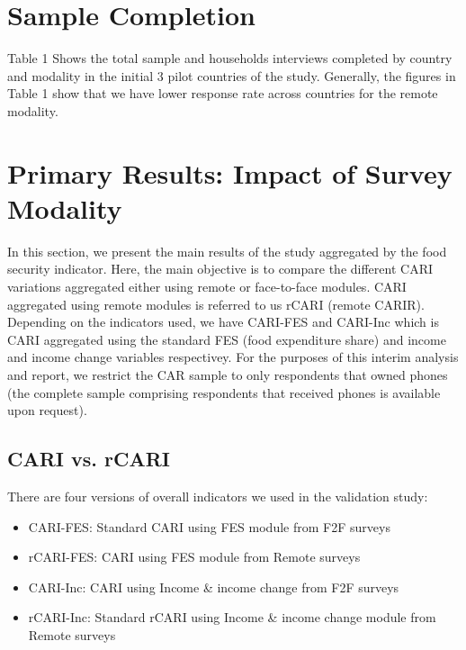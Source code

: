 \documentclass[11pt,harvard]{article}
\begin{document}
\pagebreak
	
\section{Sample Completion}
Table 1 Shows the total sample and households interviews completed by country and modality in the initial 3 pilot countries of the study. Generally, the figures in Table 1 show that we have lower response rate across countries for the remote modality.

 
\label{tab:rCARI_Overall_Completion}

\pagebreak

\section{Primary Results: Impact of Survey Modality}

In this section, we present the main results of the study aggregated by the food security indicator. Here, the main objective is to compare the different CARI variations aggregated either using remote or face-to-face modules.
CARI aggregated using remote modules is referred to us rCARI (remote CARIR). Depending on the indicators used, we have CARI-FES and CARI-Inc which is CARI aggregated using the standard FES (food expenditure share) and income and income change variables respectivey. 
For the purposes of this interim analysis and report, we restrict the CAR sample to only respondents that owned phones (the complete sample comprising respondents that received phones is available upon request).  

\subsection{CARI vs. rCARI}
There are four versions of overall indicators we used in the validation study:
\begin{itemize}[label=--, left=1.5em]
	\item CARI-FES: Standard CARI using FES module from F2F surveys
	\item rCARI-FES: CARI using FES module from Remote surveys
	\item CARI-Inc: CARI using Income \& income change from F2F surveys
	\item rCARI-Inc: Standard rCARI using Income \& income change module from Remote surveys
\end{itemize}
\end{document}
